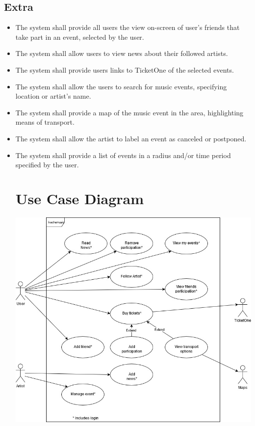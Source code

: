 \documentclass[11pt,a4paper]{article}
\begin{document}
\subsection{Extra}
\begin{itemize}
\item The system shall provide all users the view on-screen of user’s friends that take part in an event, selected by the user.
\item The system shall allow users to view news about their followed artists.
\item The system shall provide users links to TicketOne of the selected events.
\item The system shall allow the users to search for music events, specifying location or artist’s name.
\item The system shall provide a map of the music event in the area, highlighting means of transport.
\item The system shall allow the artist to label an event as canceled or postponed.
\item The system shall provide a list of events in a radius and/or time period specified by the user.
\section{Use Case Diagram}
\hspace*{-4cm}  
\includegraphics[scale=0.7]{UseCaseFinal.jpg}

\end{itemize}
\end{document}

